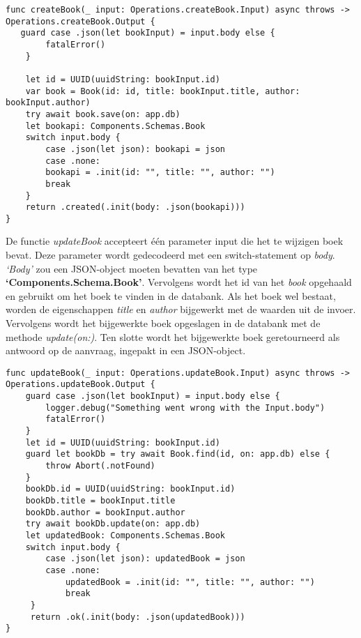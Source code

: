 \begin{lstlisting}[caption=handler file - createBook]
func createBook(_ input: Operations.createBook.Input) async throws -> Operations.createBook.Output {
   guard case .json(let bookInput) = input.body else {
        fatalError()
    }
        
    let id = UUID(uuidString: bookInput.id)
    var book = Book(id: id, title: bookInput.title, author: bookInput.author)
    try await book.save(on: app.db)
    let bookapi: Components.Schemas.Book
    switch input.body {
        case .json(let json): bookapi = json
        case .none:
        bookapi = .init(id: "", title: "", author: "")
        break
    }
    return .created(.init(body: .json(bookapi)))
}
\end{lstlisting}
De functie \textit{updateBook} accepteert één parameter input die het te wijzigen boek bevat. Deze parameter wordt gedecodeerd met een switch-statement op \textit{body}. \textit{‘Body’} zou een JSON-object moeten bevatten van het type \textbf{‘Components.Schema.Book’}. Vervolgens wordt het id van het \textit{book} opgehaald en gebruikt om het boek te vinden in de databank.  Als het boek wel bestaat, worden de eigenschappen \textit{title} en \textit{author} bijgewerkt met de waarden uit de invoer. Vervolgens wordt het bijgewerkte boek opgeslagen in de databank met de methode \textit{update(on:)}. Ten slotte wordt het bijgewerkte boek geretourneerd als antwoord op de aanvraag, ingepakt in een JSON-object.



\begin{lstlisting}[caption=handler file - updateBook]
func updateBook(_ input: Operations.updateBook.Input) async throws -> Operations.updateBook.Output {
    guard case .json(let bookInput) = input.body else {
        logger.debug("Something went wrong with the Input.body")
        fatalError()
    }
    let id = UUID(uuidString: bookInput.id)
    guard let bookDb = try await Book.find(id, on: app.db) else {
        throw Abort(.notFound)
    }
    bookDb.id = UUID(uuidString: bookInput.id)
    bookDb.title = bookInput.title
    bookDb.author = bookInput.author
    try await bookDb.update(on: app.db)
    let updatedBook: Components.Schemas.Book
    switch input.body {
        case .json(let json): updatedBook = json
        case .none:
            updatedBook = .init(id: "", title: "", author: "")
            break
     }
     return .ok(.init(body: .json(updatedBook)))
}


\end{lstlisting}
\newpage
